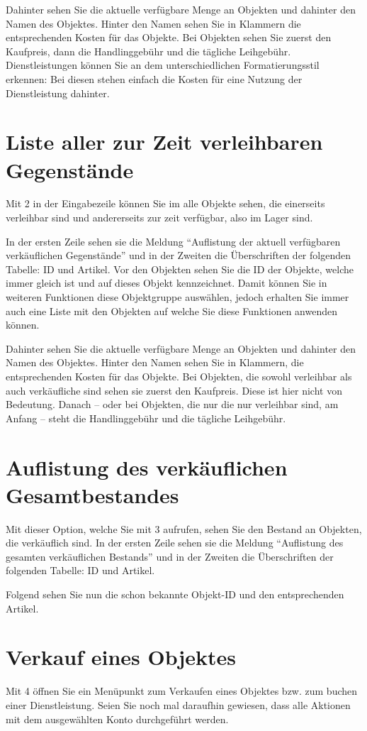 ﻿\documentclass[a4paper,12pt,titlepage]{article}
\begin{document}
Dahinter sehen Sie die aktuelle verfügbare Menge an Objekten und dahinter den Namen des Objektes.
Hinter den Namen sehen Sie in Klammern die entsprechenden Kosten für das Objekte.
Bei Objekten sehen Sie zuerst den Kaufpreis, dann die Handlinggebühr und die tägliche Leihgebühr.
Dienstleistungen können Sie an dem unterschiedlichen Formatierungsstil erkennen:
Bei diesen stehen einfach die Kosten für eine Nutzung der Dienstleistung dahinter.

\section{Liste aller zur Zeit verleihbaren Gegenstände}
Mit 2 in der Eingabezeile können Sie im alle Objekte sehen,
 die einerseits verleihbar sind und andererseits zur zeit verfügbar, also im Lager sind.

In der ersten Zeile sehen sie die Meldung \enquote{Auflistung der aktuell verfügbaren verkäuflichen Gegenstände}
 und in der Zweiten die Überschriften der folgenden Tabelle: ID und Artikel.
Vor den Objekten sehen Sie die ID der Objekte, welche immer gleich ist und auf dieses Objekt kennzeichnet.
Damit können Sie in weiteren Funktionen diese Objektgruppe auswählen,
 jedoch erhalten Sie immer auch eine Liste mit den Objekten auf welche Sie diese Funktionen anwenden können.

Dahinter sehen Sie die aktuelle verfügbare Menge an Objekten und dahinter den Namen des Objektes.
Hinter den Namen sehen Sie in Klammern, die entsprechenden Kosten für das Objekte.
Bei Objekten, die sowohl verleihbar als auch verkäufliche sind sehen sie zuerst den Kaufpreis.
Diese ist hier nicht von Bedeutung.
Danach -- oder bei Objekten, die nur die nur verleihbar sind, am Anfang --
steht die Handlinggebühr und die tägliche Leihgebühr.

\section{Auflistung des verkäuflichen Gesamtbestandes}
Mit dieser Option, welche Sie mit 3 aufrufen, sehen Sie den Bestand an Objekten, die verkäuflich sind.
In der ersten Zeile sehen sie die Meldung \enquote{Auflistung des gesamten verkäuflichen Bestands}
 und in der Zweiten die Überschriften der folgenden Tabelle: ID und Artikel.

Folgend sehen Sie nun die schon bekannte Objekt-ID und den entsprechenden Artikel.

\section{Verkauf eines Objektes}
Mit 4 öffnen Sie ein Menüpunkt zum Verkaufen eines Objektes bzw. zum buchen einer Dienstleistung.
Seien Sie noch mal daraufhin gewiesen, dass alle Aktionen mit dem ausgewählten Konto durchgeführt werden.
\end{document}
